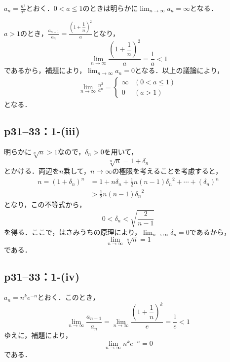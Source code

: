 \documentclass[a4paper,10pt,fleqn]{ltjsarticle}
\begin{document}
\begin{tleftbar}
    $a_n = \frac{n^2}{a^n}$とおく．$0<a \le 1$のときは明らかに$\lim_{n \to \infty} a_n=\infty$となる．\par
    $a>1$のとき，$\frac{a_{n+1}}{a_n} =\frac{\left(1+\dfrac{1}{n}\right)^2}{a}$となり，
    \[
        \lim_{n \to \infty} \frac{\left(1+\dfrac{1}{n}\right)^2}{a} = \frac{1}{a} <1
    \]
    であるから，補題により，$\lim_{n \to \infty} a_n =0$となる．以上の議論により，
    \begin{align*}
        \lim_{n \to \infty} \frac{n^2}{a^n}
        =
        \begin{cases}
            \infty & (0<a \le 1) \\
            0      & (a>1)
        \end{cases}
    \end{align*}
    となる．
\end{tleftbar}
\subsection*{p31--33：1-(iii)}
\begin{tleftbar}
    明らかに$\sqrt[n]{n} >1$なので，$\delta_n >0$を用いて，
    \[
        \sqrt[n]{n} = 1+ \delta_n
    \]
    とかける．両辺を$n$乗して，$n \to \infty$の極限を考えることを考慮すると，
    \begin{align*}
        n = (1+\delta_n)^n & =1 + n \delta_n + \frac{1}{2}n(n-1) {\delta_n}^2 + \cdots + (\delta_n)^n \\
                           & > \frac{1}{2}n(n-1) {\delta_n}^2
    \end{align*}
    となり，この不等式から，
    \[
        0<\delta_n < \sqrt{\frac{2}{n-1}}
    \]
    を得る．ここで，はさみうちの原理により，$\lim_{n \to \infty} \delta_n =0$であるから，
    \[
        \lim_{n \to \infty} \sqrt[n]{n} =1
    \]
    である．
\end{tleftbar}

\subsection*{p31--33：1-(iv)}
\begin{tleftbar}
    $a_n= n^k e^{-n}$とおく．このとき，
    \[
        \lim_{n \to \infty} \frac{a_{n+1}}{a_n} =  \lim_{n \to \infty} \frac{\left(1+\dfrac{1}{n}\right)^k}{e} =\frac{1}{e} <1
    \]
    ゆえに，補題により，
    \[
        \lim_{n \to \infty} n^k e^{-n}=0
    \]
    である．
\end{tleftbar}
\end{document}
